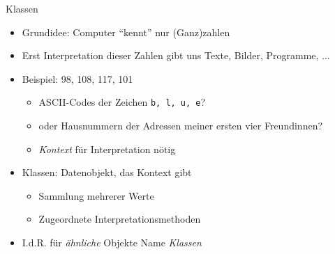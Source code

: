 \begin{frame}{Klassen}
%
\begin{itemize}
\item Grundidee: Computer \enquote{kennt} nur (Ganz)zahlen
\item Erst Interpretation dieser Zahlen gibt uns Texte, Bilder, Programme, ...
\item Beispiel: 98, 108, 117, 101
	\begin{itemize}
	\item ASCII-Codes der Zeichen \texttt{b, l, u, e}?
	\item oder Hausnummern der Adressen meiner ersten vier Freundinnen?
	\item \emph{Kontext} für Interpretation nötig
	\end{itemize}
\item Klassen: Datenobjekt, das Kontext gibt
	\begin{itemize}
	\item Sammlung mehrerer Werte
	\item Zugeordnete Interpretationsmethoden
	\end{itemize}
\item I.\;d.\;R. für \emph{ähnliche} Objekte \Thus Name \emph{Klassen}
\end{itemize}
%
\end{frame}


